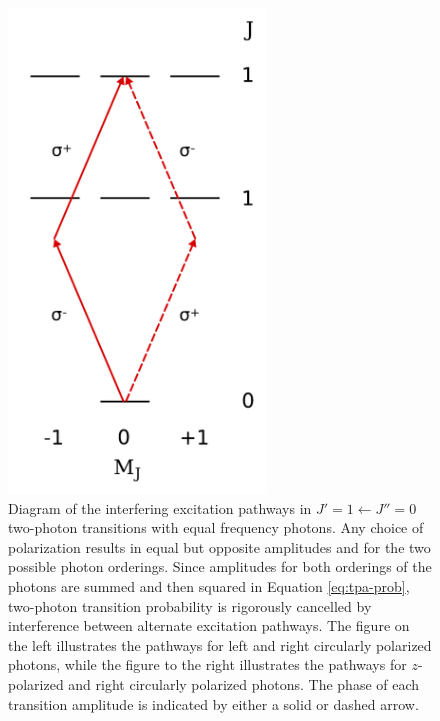 \documentclass[12pt]{mitthesis}
\begin{document}
\begin{figure}
  \caption{Diagram of the interfering excitation pathways in $J'=1
    \leftarrow J''=0$ two-photon transitions with equal frequency
    photons.  Any choice of polarization results in equal but opposite
    amplitudes and for the two possible photon orderings. Since
    amplitudes for both orderings of the photons are summed and then
    squared in Equation \ref{eq:tpa-prob}, two-photon transition
    probability is rigorously cancelled by interference between
    alternate excitation pathways. The figure on the left illustrates
    the pathways for left and right circularly polarized photons,
    while the figure to the right illustrates the pathways for
    $z$-polarized and right circularly polarized photons.  The phase
    of each transition amplitude is indicated by either a solid or
    dashed arrow.}
  \label{fig:hg-forbidden}
  \centering
  \vspace{5mm}
  \includegraphics[width=2.7in]{hg-forbidden-samepol.pdf}

\end{figure}
\end{document}
